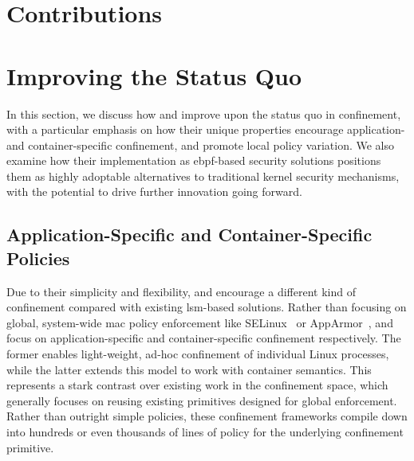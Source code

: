 \section{Contributions}%
\label{s:disc-contributions}



\section{Improving the Status Quo}%
\label{s:disc-improving}


In this section, we discuss how \bpfbox{} and \bpfcontain{} improve upon the status quo in
confinement, with a particular emphasis on how their unique properties encourage
application- and container-specific confinement, and promote local policy variation. We
also examine how their implementation as \gls{ebpf}-based security solutions positions
them as highly adoptable alternatives to traditional kernel security mechanisms, with the
potential to drive further innovation going forward.

\subsection{Application-Specific and Container-Specific Policies}

Due to their simplicity and flexibility, \bpfbox{} and \bpfcontain{} encourage a different
kind of confinement compared with existing \gls{lsm}-based solutions. Rather than focusing
on global, system-wide \gls{mac} policy enforcement like
SELinux~\cite{smalley2001_selinux} or AppArmor~\cite{cowan2000_apparmor}, \bpfbox{} and
\bpfcontain{} focus on application-specific and container-specific confinement
respectively. The former enables light-weight, ad-hoc confinement of individual Linux
processes, while the latter extends this model to work with container semantics.  This
represents a stark contrast over existing work in the confinement space, which generally
focuses on reusing existing primitives designed for global enforcement.  Rather than
outright simple policies, these confinement frameworks compile down into hundreds or even
thousands of lines of policy for the underlying confinement primitive.

